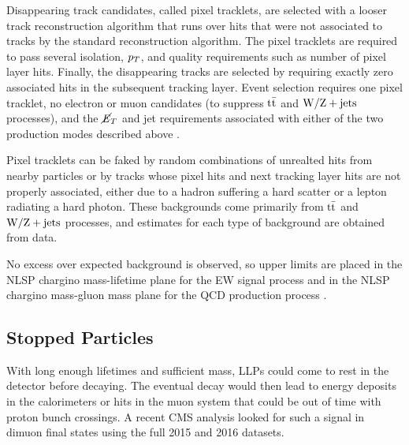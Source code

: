 \documentclass[12pt]{article}
\begin{document}
    Disappearing track candidates, called pixel tracklets, are selected with a looser track reconstruction algorithm that runs over hits that were not associated to tracks by the standard reconstruction algorithm. The pixel tracklets are required to pass several isolation, $p_T$, and quality requirements such as number of pixel layer hits. Finally, the disappearing tracks are selected by requiring exactly zero associated hits in the subsequent tracking layer. Event selection requires one pixel tracklet, no electron or muon candidates (to suppress $\mathrm{t}\bar{\mathrm{t}}$ and $\mathrm{W}/\mathrm{Z} + \mathrm{jets}$ processes), and the $\cancel{\it{E}}_{T}$ and jet requirements associated with either of the two production modes described above .
    
    Pixel tracklets can be faked by random combinations of unrealted hits from nearby particles or by tracks whose pixel hits and next tracking layer hits are not properly associated, either due to a hadron suffering a hard scatter or a lepton radiating a hard photon. These backgrounds come primarily from $\mathrm{t}\bar{\mathrm{t}}$ and $\mathrm{W}/\mathrm{Z} + \mathrm{jets}$ processes, and estimates for each type of background are obtained from data. 

    No excess over expected background is observed, so upper limits are placed in the NLSP chargino mass-lifetime plane for the EW signal process and in the NLSP chargino mass-gluon mass plane for the QCD production process . 

\subsection{Stopped Particles}
    With long enough lifetimes and sufficient mass, LLPs could come to rest in the detector before decaying. The eventual decay would then lead to energy deposits in the calorimeters or hits in the muon system that could be out of time with proton bunch crossings. A recent CMS analysis looked for such a signal in dimuon final states using the full 2015 and 2016 datasets. 
\end{document}
